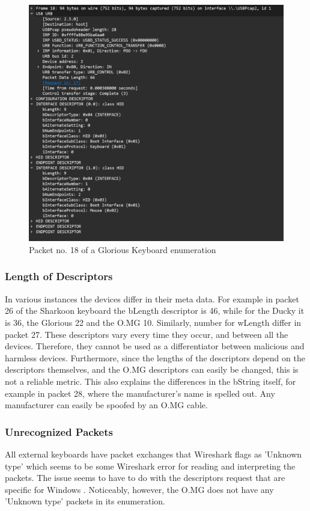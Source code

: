 \begin{figure}[H]
    \centering
    \includegraphics[width=0.75\linewidth]{visuals/packet18glorious.png}
    \caption{Packet no. 18 of a Glorious Keyboard enumeration}
    \label{fig:packet18Glorious}
\end{figure}

\subsubsection{Length of Descriptors}

In various instances the devices differ in their meta data. For example in packet 26 of the Sharkoon keyboard the bLength descriptor is 46, while for the Ducky it is 36, the Glorious 22 and the O.MG 10. Similarly, number for wLength differ in packet 27. These descriptors vary every time they occur, and between all the devices. Therefore, they cannot be used as a differentiator between malicious and harmless devices. Furthermore, since the lengths of the descriptors depend on the descriptors themselves, and the O.MG descriptors can easily be changed, this is not a reliable metric.
This also explains the differences in the bString itself, for example in packet 28, where the manufacturer's name is spelled out. Any manufacturer can easily be spoofed by an O.MG cable. 




\subsubsection{Unrecognized Packets}

All external keyboards have packet exchanges that Wireshark flags as 'Unknown type' which seems to be some Wireshark error for reading and interpreting the packets. The issue seems to have to do with the descriptors request that are specific for Windows \cite{USBPcapDidNot}. Noticeably, however, the O.MG does not have any 'Unknown type' packets in its enumeration.

